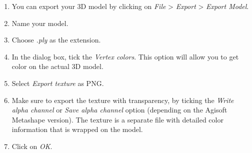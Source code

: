 \documentclass[
]{book}
\begin{document}
\begin{enumerate}
\def\labelenumi{\arabic{enumi}.}
\item
  You can export your 3D model by clicking on \emph{File} \textgreater{} \emph{Export} \textgreater{}
  \emph{Export Model}.
\item
  Name your model.
\item
  Choose \emph{.ply} as the extension.
\item
  In the dialog box, tick the \emph{Vertex colors}. This option will allow
  you to get color on the actual 3D model.
\item
  Select \emph{Export texture} as PNG.
\item
  Make sure to export the texture with transparency, by ticking the
  \emph{Write alpha channel} or \emph{Save alpha channel} option (depending on the Agisoft
  Metashape version). The texture is a separate file with detailed color
  information that is wrapped on the model.
\item
  Click on \emph{OK}.
\end{enumerate}

  
\end{document}
